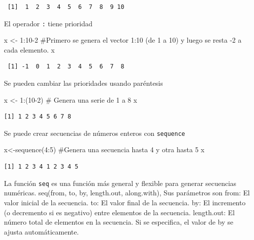 \documentclass[
  letterpaper,
  DIV=11,
  numbers=noendperiod]{scrreprt}
\newenvironment{Shaded}{\begin{snugshade}}{\end{snugshade}}
\newcommand{\CommentTok}[1]{\textcolor[rgb]{0.37,0.37,0.37}{#1}}
\newcommand{\DecValTok}[1]{\textcolor[rgb]{0.68,0.00,0.00}{#1}}
\newcommand{\FunctionTok}[1]{\textcolor[rgb]{0.28,0.35,0.67}{#1}}
\newcommand{\NormalTok}[1]{\textcolor[rgb]{0.00,0.23,0.31}{#1}}
\newcommand{\OtherTok}[1]{\textcolor[rgb]{0.00,0.23,0.31}{#1}}
\newcommand{\SpecialCharTok}[1]{\textcolor[rgb]{0.37,0.37,0.37}{#1}}
\begin{document}
\begin{verbatim}
 [1]  1  2  3  4  5  6  7  8  9 10
\end{verbatim}

El operador \texttt{:} tiene prioridad

\begin{Shaded}
\begin{Highlighting}[]
\NormalTok{x }\OtherTok{\textless{}{-}} \DecValTok{1}\SpecialCharTok{:}\DecValTok{10{-}2} \CommentTok{\#Primero se genera el vector 1:10 (de 1 a 10) y luego se resta {-}2 a cada elemento.}
\NormalTok{x}
\end{Highlighting}
\end{Shaded}

\begin{verbatim}
 [1] -1  0  1  2  3  4  5  6  7  8
\end{verbatim}

Se pueden cambiar las prioridades usando paréntesis

\begin{Shaded}
\begin{Highlighting}[]
\NormalTok{x }\OtherTok{\textless{}{-}} \DecValTok{1}\SpecialCharTok{:}\NormalTok{(}\DecValTok{10{-}2}\NormalTok{) }\CommentTok{\# Genera una serie de 1 a 8}
\NormalTok{x}
\end{Highlighting}
\end{Shaded}

\begin{verbatim}
[1] 1 2 3 4 5 6 7 8
\end{verbatim}

Se puede crear secuencias de números enteros con \texttt{sequence}

\begin{Shaded}
\begin{Highlighting}[]
\NormalTok{x}\OtherTok{\textless{}{-}}\FunctionTok{sequence}\NormalTok{(}\DecValTok{4}\SpecialCharTok{:}\DecValTok{5}\NormalTok{) }
\CommentTok{\#Genera una secuencia hasta 4 y otra hasta 5}
\NormalTok{x}
\end{Highlighting}
\end{Shaded}

\begin{verbatim}
[1] 1 2 3 4 1 2 3 4 5
\end{verbatim}

La función \texttt{seq} es una función más general y flexible para
generar secuencias numéricas. seq(from, to, by, length.out, along.with),
Sus parámetros son from: El valor inicial de la secuencia. to: El valor
final de la secuencia. by: El incremento (o decremento si es negativo)
entre elementos de la secuencia. length.out: El número total de
elementos en la secuencia. Si se especifica, el valor de by se ajusta
automáticamente.
\end{document}
